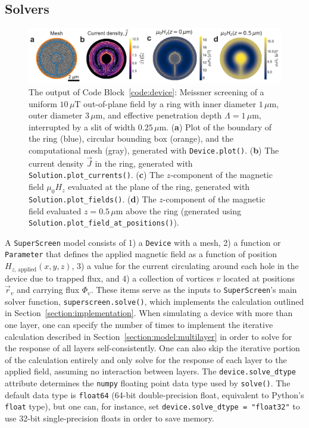 \documentclass[final,3p,times,twocolumn]{elsarticle}
\newcommand{\inline}[1]{\texttt{#1}\xspace}
\newcommand{\SuperScreen}{\inline{SuperScreen}}
\newcommand{\um}{\mu\mathrm{m}}
\begin{document}
\subsection{Solvers}
\label{section:overview:solvers}
\begin{figure}
    \centering
    \includegraphics[width=\textwidth]{examples/images/ring_with_slit.pdf}
    \caption{The output of Code Block~\ref{code:device}: Meissner screening of a uniform $10\,\mu\mathrm{T}$ out-of-plane field by a ring with inner diameter $1\,\um$, outer diameter $3\,\um$, and effective penetration depth $\Lambda=1\,\um$, interrupted by a slit of width $0.25\,\um$. ({\bf a}) Plot of the boundary of the ring (blue), circular bounding box (orange), and the computational mesh (gray), generated with \inline{Device.plot()}. ({\bf b}) The current density $\vec{J}$ in the ring, generated with \inline{Solution.plot_currents()}. ({\bf c}) The $z$-component of the magnetic field $\mu_0H_z$ evaluated at the plane of the ring, generated with \inline{Solution.plot_fields()}. ({\bf d}) The $z$-component of the magnetic field evaluated $z=0.5\,\um$ above the ring (generated using \inline{Solution.plot_field_at_positions()}).}
    \label{fig:ring-with-slit}
\end{figure}

A \SuperScreen model consists of 1) a \inline{Device} with a mesh, 2) a function or \inline{Parameter} that defines the applied magnetic field as a function of position $H_{z,\,\mathrm{applied}}(x, y, z)$, 3) a value for the current circulating around each hole in the device due to trapped flux, and 4) a collection of vortices $v$ located at positions $\vec{r}_v$ and carrying flux $\Phi_v$. These items serve as the inputs to \SuperScreen's main solver function, \inline{superscreen.solve()}, which implements the calculation outlined in Section~\ref{section:implementation}. When simulating a device with more than one layer, one can specify the number of times to implement the iterative calculation described in Section~\ref{section:model:multilayer} in order to solve for the response of all layers self-consistently. One can also skip the iterative portion of the calculation entirely and only solve for the response of each layer to the applied field, assuming no interaction between layers. The \inline{device.solve_dtype} attribute determines the \inline{numpy} floating point data type used by \inline{solve()}. The default data type is \inline{float64} (64-bit double-precision float, equivalent to Python's \inline{float} type), but one can, for instance, set \inline{device.solve_dtype = "float32"} to use 32-bit single-precision floats in order to save memory.
\end{document}
